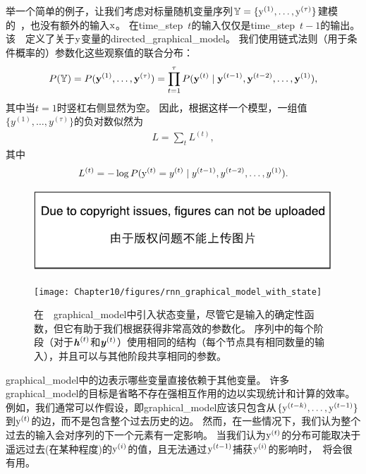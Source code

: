 举一个简单的例子，让我们考虑对标量随机变量序列$ \mathbb{Y} = \{\mathrm{y}^{(1)},\dots,\mathrm{y}^{(\tau)}\}$建模的~，也没有额外的输入$\mathrm{x}$。
在\gls{time_step}~$t$的输入仅仅是\gls{time_step}~$t-1$的输出。
该~~定义了关于$\mathrm{y}$变量的\gls{directed_graphical_model}。
我们使用链式法则（用于条件概率的）参数化这些观察值的联合分布：
\begin{align}
 P(\mathbb{Y}) = P(\mathbf{y}^{(1)},\dots,\mathbf{y}^{(\tau)}) = \prod_{t=1}^{\tau}P(\mathbf{y}^{(t)} \mid \mathbf{y}^{(t-1)},\mathbf{y}^{(t-2)},
 \dots,\mathbf{y}^{(1)}),
\end{align}
其中当$t=1$时竖杠右侧显然为空。
因此，根据这样一个模型，一组值$\{y^{(1)},\dots,y^{(\tau)} \}$的负对数似然为
\begin{align}
 L = \sum_{t} L^{(t)},
\end{align}
其中
\begin{align}
 L^{(t)} = -\log P(\mathrm{y}^{(t)} = y^{(t)} \mid y^{(t-1)},y^{(t-2)}, \dots, y^{(1)}).
\end{align}
\begin{figure}[!htb]
\ifOpenSource
\centerline{\includegraphics{figure.pdf}}
\else
\centerline{\texttt{[image: Chapter10/figures/rnn\_graphical\_model\_with\_state]}}
\fi
\caption{在~~\gls{graphical_model}中引入状态变量，尽管它是输入的确定性函数，但它有助于我们根据获得非常高效的参数化。
序列中的每个阶段（对于$\boldsymbol{\mathit{h}}^{(t)}$和$\boldsymbol{\mathit{y}}^{(t)}$）使用相同的结构（每个节点具有相同数量的输入），并且可以与其他阶段共享相同的参数。
}
\label{fig:chap10_rnn_graphical_model_with_state}
\end{figure}

\gls{graphical_model}中的边表示哪些变量直接依赖于其他变量。
许多\gls{graphical_model}的目标是省略不存在强相互作用的边以实现统计和计算的效率。
例如，我们通常可以作假设，即\gls{graphical_model}应该只包含从$\{ \mathrm{y}^{(t-k)}, \dots, \mathrm{y}^{(t-1)}\}$到$\mathrm{y}^{(t)}$的边，而不是包含整个过去历史的边。
然而，在一些情况下，我们认为整个过去的输入会对序列的下一个元素有一定影响。
当我们认为$\mathrm{y}^{(t)}$的分布可能取决于遥远过去(在某种程度)的$\mathrm{y}^{(i)}$的值，且无法通过$\mathrm{y}^{(t-1)}$捕获$\mathrm{y}^{(i)}$的影响时，~将会很有用。

